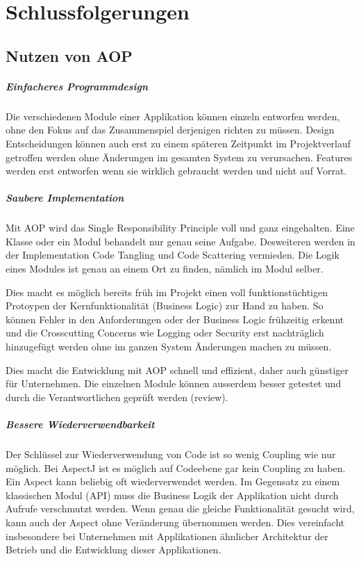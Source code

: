 \chapter{Schlussfolgerungen}
\label{chap:schlussfolgerungen}
\section{Nutzen von AOP}
\paragraph{Einfacheres Programmdesign}
Die verschiedenen Module einer Applikation können einzeln entworfen werden, ohne den Fokus auf das Zusammenspiel derjenigen richten zu müssen. Design Entscheidungen können auch erst zu einem späteren Zeitpunkt im Projektverlauf getroffen werden ohne Änderungen im gesamten System zu verursachen. Features werden erst entworfen wenn sie wirklich gebraucht werden und nicht \glqq{}auf Vorrat\grqq.
\paragraph{Saubere Implementation}
Mit AOP wird das Single Responsibility Principle voll und ganz eingehalten. Eine Klasse oder ein Modul behandelt nur genau seine Aufgabe. Desweiteren werden in der Implementation Code Tangling und Code Scattering vermieden. Die Logik eines Modules ist genau an einem Ort zu finden, nämlich im Modul selber.

Dies macht es möglich bereits früh im Projekt einen voll funktionstüchtigen Protoypen der Kernfunktionalität (Business Logic) zur Hand zu haben. So können Fehler in den Anforderungen oder der Business Logic frühzeitig erkennt und die Crosscutting Concerns wie Logging oder Security erst nachträglich hinzugefügt werden ohne im ganzen System Änderungen machen zu müssen.

Dies macht die Entwicklung mit AOP schnell und effizient, daher auch günstiger für Unternehmen. Die einzelnen Module können ausserdem besser getestet und durch die Verantwortlichen geprüft werden (review).
\paragraph{Bessere Wiederverwendbarkeit}
Der Schlüssel zur Wiederverwendung von Code ist so wenig Coupling wie nur möglich. Bei AspectJ ist es möglich auf Codeebene gar kein Coupling zu haben. Ein Aspect kann beliebig oft wiederverwendet werden. Im Gegensatz zu einem klassischen Modul (API) muss die Business Logik der Applikation nicht durch Aufrufe verschmutzt werden. Wenn genau die gleiche Funktionalität gesucht wird, kann auch der Aspect ohne Veränderung übernommen werden. Dies vereinfacht insbesondere bei Unternehmen mit Applikationen ähnlicher Architektur der Betrieb und die Entwicklung dieser Applikationen. 
